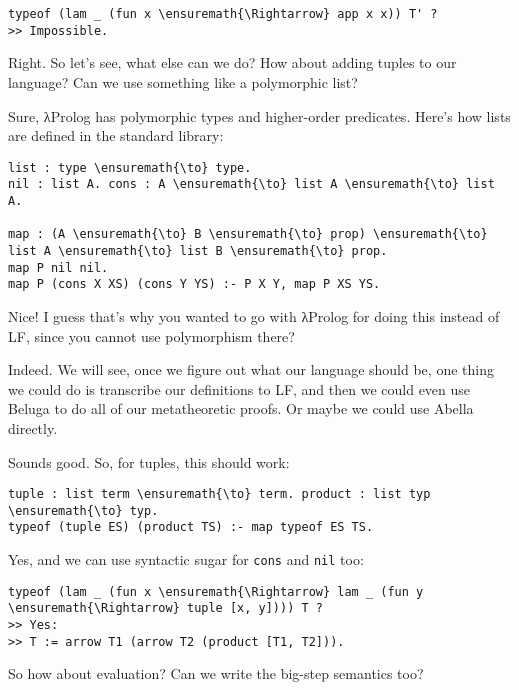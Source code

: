 \begin{verbatim}
typeof (lam _ (fun x \ensuremath{\Rightarrow} app x x)) T' ?
>> Impossible.
\end{verbatim}

\heroSTUDENT{} Right. So let's see, what else can we do? How about adding
tuples to our language? Can we use something like a polymorphic list?

\heroADVISOR{} Sure, \foreignlanguage{greek}{λ}Prolog has polymorphic types and higher-order
predicates. Here's how lists are defined in the standard library:

\begin{verbatim}
list : type \ensuremath{\to} type.
nil : list A. cons : A \ensuremath{\to} list A \ensuremath{\to} list A.

map : (A \ensuremath{\to} B \ensuremath{\to} prop) \ensuremath{\to} list A \ensuremath{\to} list B \ensuremath{\to} prop.
map P nil nil.
map P (cons X XS) (cons Y YS) :- P X Y, map P XS YS.
\end{verbatim}

\heroSTUDENT{} Nice! I guess that's why you wanted to go with \foreignlanguage{greek}{λ}Prolog for
doing this instead of LF, since you cannot use polymorphism there?

\heroADVISOR{} Indeed. We will see, once we figure out what our language
should be, one thing we could do is transcribe our definitions to LF,
and then we could even use Beluga \citep{beluga-main-reference} to do
all of our metatheoretic proofs. Or maybe we could use Abella
\citep{abella-main-reference} directly.

\heroSTUDENT{} Sounds good. So, for tuples, this should work:

\begin{verbatim}
tuple : list term \ensuremath{\to} term. product : list typ \ensuremath{\to} typ.
typeof (tuple ES) (product TS) :- map typeof ES TS.
\end{verbatim}

\heroADVISOR{} Yes, and we can use syntactic sugar for \texttt{cons} and
\texttt{nil} too:

\begin{verbatim}
typeof (lam _ (fun x \ensuremath{\Rightarrow} lam _ (fun y \ensuremath{\Rightarrow} tuple [x, y]))) T ?
>> Yes:
>> T := arrow T1 (arrow T2 (product [T1, T2])).
\end{verbatim}

\heroSTUDENT{} So how about evaluation? Can we write the big-step semantics
too?

